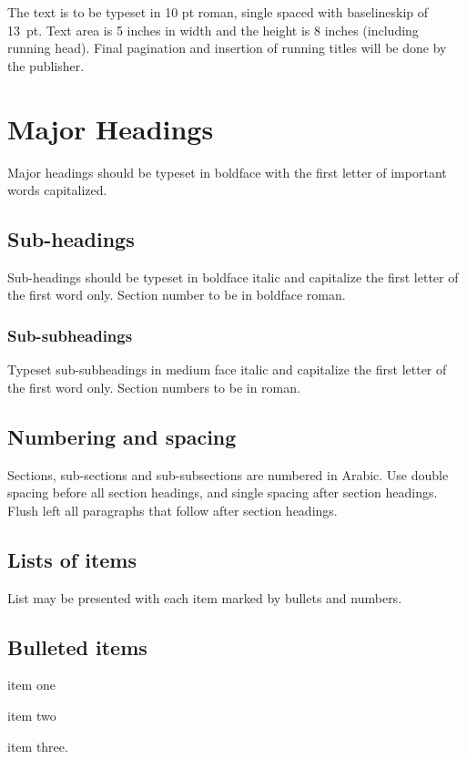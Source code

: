 \documentclass{ws-ijcm}
\begin{document}
The text is to be typeset in 10 pt roman, single spaced with
baselineskip of 13~pt. Text area is 5 inches in width and the 
height is 8 inches (including running head).  Final pagination and
insertion of running titles will be done by the publisher.

\section{Major Headings}
Major headings should be typeset in boldface with the first letter of
important words capitalized.

\subsection{Sub-headings}
Sub-headings should be typeset in boldface italic and capitalize the
first letter of the first word only. Section number to be in boldface
roman.

\subsubsection{Sub-subheadings}
Typeset sub-subheadings in medium face italic and capitalize the first
letter of the first word only. Section numbers to be in roman.

\subsection{Numbering and spacing}
Sections, sub-sections and sub-subsections are numbered in Arabic.
Use double spacing before all section headings, and single spacing
after section headings. Flush left all paragraphs that follow after
section headings.

\subsection{Lists of items}
List may be presented with each item marked by bullets and numbers.

\subsection*{Bulleted items}

\begin{itemlist}
\item item one
\item item two
\item item three.
\end{itemlist}
\end{document}
